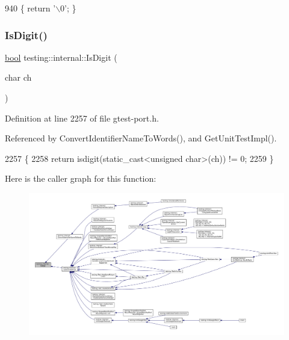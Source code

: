 \begin{DoxyCode}
940 \{ \textcolor{keywordflow}{return} \textcolor{charliteral}{'\(\backslash\)0'}; \}
\end{DoxyCode}
\mbox{\label{namespacetesting_1_1internal_a4bd96b7fa6486802d33ddc217af55a39}} 
\subsubsection{\texorpdfstring{Is\+Digit()}{IsDigit()}}
{\footnotesize\ttfamily \hyperlink{classbool}{bool} testing\+::internal\+::\+Is\+Digit (\begin{DoxyParamCaption}\item[{char}]{ch }\end{DoxyParamCaption})\hspace{0.3cm}{\ttfamily [inline]}}



Definition at line 2257 of file gtest-\/port.\+h.



Referenced by Convert\+Identifier\+Name\+To\+Words(), and Get\+Unit\+Test\+Impl().


\begin{DoxyCode}
2257                              \{
2258   \textcolor{keywordflow}{return} isdigit(static\_cast<unsigned char>(ch)) != 0;
2259 \}
\end{DoxyCode}
Here is the caller graph for this function\+:
\nopagebreak
\begin{figure}[H]
\begin{center}
\leavevmode
\includegraphics[width=350pt]{namespacetesting_1_1internal_a4bd96b7fa6486802d33ddc217af55a39_icgraph}
\end{center}
\end{figure}
\mbox{\label{namespacetesting_1_1internal_ac26ce3883bc8919c27074975e958f3b7}} 
